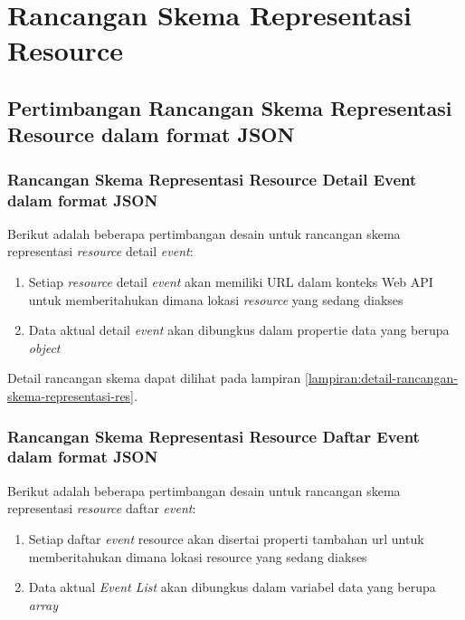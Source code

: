 \documentclass[a4paper, 12pt, oneside]{report}
\begin{document}
\section{Rancangan Skema Representasi Resource}

\subsection{Pertimbangan Rancangan Skema Representasi Resource dalam format JSON}

\subsubsection{Rancangan Skema Representasi Resource Detail Event dalam format JSON}

\onehalfspacing Berikut adalah beberapa pertimbangan desain untuk rancangan skema representasi \textit{resource} detail \textit{event}:

\begin{enumerate}
  \item Setiap \textit{resource} detail \textit{event} akan memiliki URL dalam konteks Web API untuk memberitahukan dimana lokasi \textit{resource} yang sedang diakses
  \item Data aktual detail \textit{event} akan dibungkus dalam propertie data yang berupa \textit{object}
\end{enumerate}

Detail rancangan skema dapat dilihat pada lampiran \ref{lampiran:detail-rancangan-skema-representasi-res}.

\subsubsection{Rancangan Skema Representasi Resource Daftar Event dalam format JSON}

\onehalfspacing Berikut adalah beberapa pertimbangan desain untuk rancangan skema representasi \textit{resource} daftar \textit{event}:

\begin{enumerate}
  \item Setiap daftar \textit{event} resource akan disertai properti tambahan url untuk memberitahukan dimana lokasi resource yang sedang diakses
  \item Data aktual \textit{Event List} akan dibungkus dalam variabel data yang berupa \textit{array}
\end{enumerate}
\end{document}
